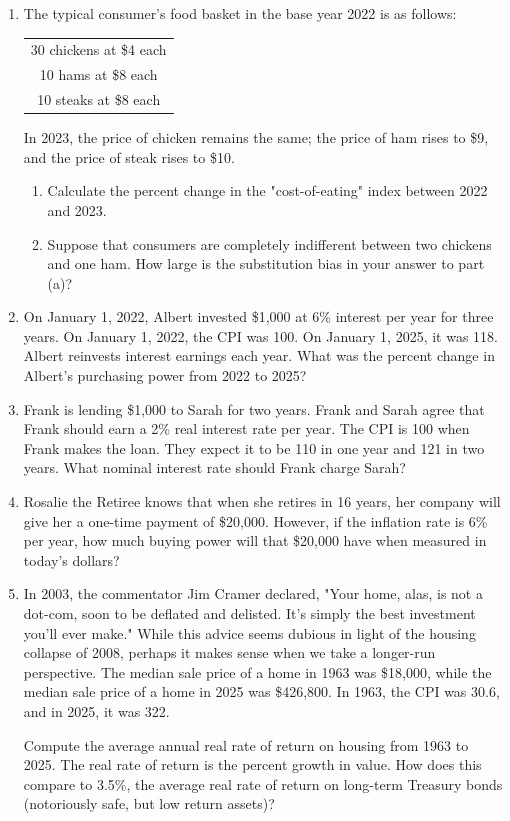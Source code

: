 \documentclass{article}
\begin{document}
\begin{enumerate}
\item The typical consumer's food basket in the base year 2022 is as follows:
	\begin{center}
	\begin{tabular}{c}
	30 chickens at \$4 each \\
	10 hams at \$8 each \\
	10 steaks at \$8 each
	\end{tabular}
	\end{center}
In 2023, the price of chicken remains the same; the price of ham rises to \$9, and the price of steak rises to \$10.

	\begin{enumerate}
	
	\item Calculate the percent change in the "cost-of-eating" index between 2022 and 2023.
	
	\item Suppose that consumers are completely indifferent between two chickens and one ham. How large is the substitution bias in your answer to part (a)?
	
	\end{enumerate}
	
\item On January 1, 2022, Albert invested \$1,000 at 6\% interest per year for three years. On January 1, 2022, the CPI was 100. On January 1, 2025, it was 118. Albert reinvests interest earnings each year. What was the percent change in Albert's purchasing power from 2022 to 2025?

\item Frank is lending \$1,000 to Sarah for two years. Frank and Sarah agree that Frank should earn a 2\% real interest rate per year. The CPI is 100 when Frank makes the loan. They expect it to be 110 in one year and 121 in two years. What nominal interest rate should Frank charge Sarah?

\item Rosalie the Retiree knows that when she retires in 16 years, her company will give her a one-time payment of \$20,000. However, if the inflation rate is 6\% per year, how much buying power will that \$20,000 have when measured in today's dollars?

\item In 2003, the commentator Jim Cramer declared, "Your home, alas, is not a dot-com, soon to be deflated and delisted. It's simply the best investment you'll ever make." While this advice seems dubious in light of the housing collapse of 2008, perhaps it makes sense when we take a longer-run perspective. The median sale price of a home in 1963 was \$18,000, while the median sale price of a home in 2025 was \$426,800. In 1963, the CPI was 30.6, and in 2025, it was 322. 

Compute the average annual real rate of return on housing from 1963 to 2025. The real rate of return is the percent growth in value. How does this compare to 3.5\%, the average real rate of return on long-term Treasury bonds (notoriously safe, but low return assets)? 

\end{enumerate}
\end{document}
